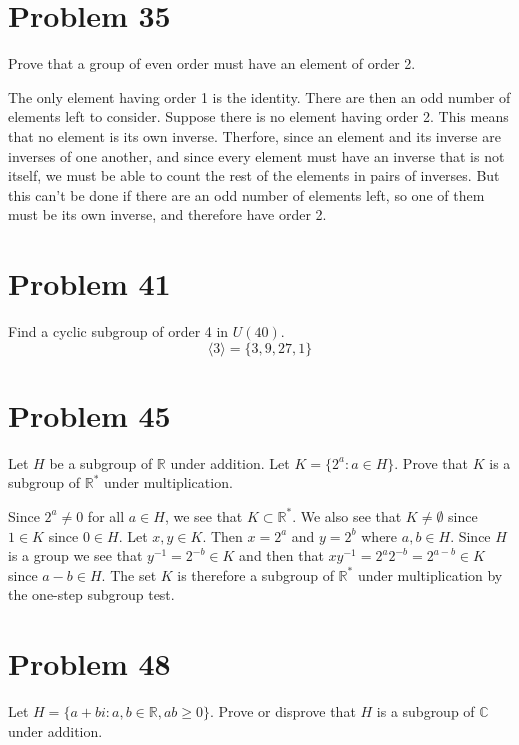 \documentclass{article}
\begin{document}
\section*{Problem 35}

Prove that a group of even order must have an element of order 2.

The only element having order 1 is the identity.  There are then
an odd number of elements left to consider.  Suppose there is no
element having order 2.  This means that no element is its own inverse.
Therfore, since an element and its inverse are inverses of one another,
and since every element must have an inverse that is not itself, we
must be able to count the rest of the elements in pairs of inverses.
But this can't be done if there are an odd number of elements left,
so one of them must be its own inverse, and therefore have order 2.

\section*{Problem 41}

Find a cyclic subgroup of order 4 in $U(40)$.
\begin{equation*}
\langle 3\rangle = \{ 3, 9, 27, 1 \}
\end{equation*}

\section*{Problem 45}

Let $H$ be a subgroup of $\mathbb{R}$ under addition.
Let $K=\{2^a:a\in H\}$.
Prove that $K$ is a subgroup of $\mathbb{R}^{*}$ under multiplication.

Since $2^a\neq 0$ for all $a\in H$, we see that $K\subset\mathbb{R}^{*}$.
We also see that $K\neq\emptyset$ since $1\in K$ since $0\in H$.
Let $x,y\in K$.  Then $x=2^a$ and $y=2^b$ where $a,b\in H$.  Since $H$
is a group we see that $y^{-1}=2^{-b}\in K$ and then that
$xy^{-1}=2^a2^{-b}=2^{a-b}\in K$ since $a-b\in H$.  The set $K$ is
therefore a subgroup of $\mathbb{R}^{*}$ under multiplication
by the one-step subgroup test.

\section*{Problem 48}

Let $H=\{a+bi:a,b\in\mathbb{R},ab\geq 0\}$.  Prove or disprove that $H$
is a subgroup of $\mathbb{C}$ under addition.
\end{document}
